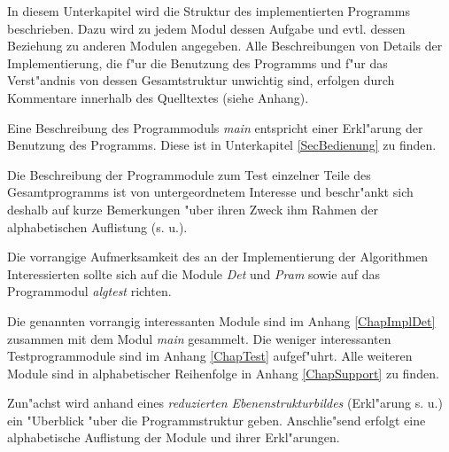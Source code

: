 
\label{SecModule}

In diesem Unterkapitel wird die Struktur des implementierten Programms 
beschrieben. Dazu wird zu jedem Modul dessen Aufgabe und evtl. dessen
Beziehung zu anderen Modulen angegeben. Alle Beschreibungen von Details
der Implementierung, die f"ur die Benutzung des Programms und f"ur 
das Verst"andnis von dessen Gesamtstruktur unwichtig sind, erfolgen durch 
Kommentare innerhalb des Quelltextes (siehe Anhang).

Eine Beschreibung des Programmoduls {\em main} entspricht einer Erkl"arung
der Benutzung des Programms. Diese ist in Unterkapitel \ref{SecBedienung}
zu finden.

Die Beschreibung der Programmodule zum Test einzelner Teile des 
Gesamtprogramms ist von untergeordnetem Interesse und beschr"ankt sich 
deshalb auf kurze Bemerkungen "uber ihren Zweck ihm Rahmen der 
alphabetischen Auflistung (s. u.).

Die vorrangige Aufmerksamkeit des an der Implementierung der Algorithmen
Interessierten sollte sich auf die Module {\em Det} und {\em Pram} sowie
auf das Programmodul {\em algtest} richten. 

Die genannten vorrangig interessanten Module sind im Anhang 
\ref{ChapImplDet} zusammen mit dem Modul {\em main} gesammelt. Die
weniger interessanten Testprogrammodule sind im Anhang \ref{ChapTest}
aufgef"uhrt. Alle weiteren Module sind in alphabetischer Reihenfolge in
Anhang \ref{ChapSupport} zu finden.

Zun"achst wird anhand eines {\em reduzierten Ebenenstrukturbildes}
(Erkl"arung s. u.) ein "Uberblick "uber die Programmstruktur geben. 
Anschlie"send erfolgt eine alphabetische Auflistung der Module und 
ihrer Erkl"arungen.

